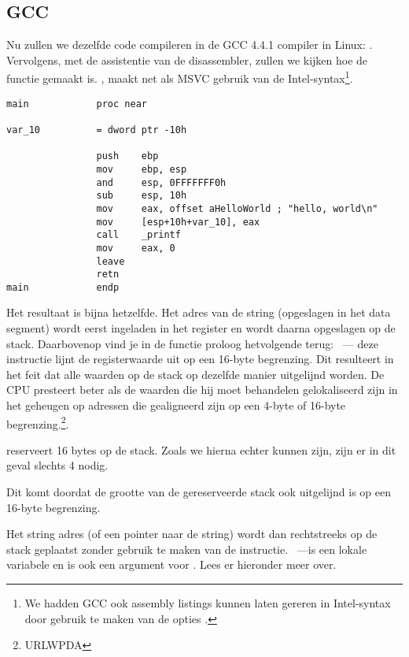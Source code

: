 \subsection{GCC}

Nu zullen we dezelfde \CCpp code compileren in de GCC 4.4.1 compiler in Linux: .
Vervolgens, met de assistentie van de \IDA disassembler, zullen we kijken hoe de \main functie gemaakt is.
\IDA, maakt net als MSVC gebruik van de Intel-syntax\footnote{We hadden GCC ook assembly listings kunnen laten gereren in Intel-syntax door gebruik te maken van de opties .}.

\begin{lstlisting}[caption=code in \IDA]
main            proc near

var_10          = dword ptr -10h

                push    ebp
                mov     ebp, esp
                and     esp, 0FFFFFFF0h
                sub     esp, 10h
                mov     eax, offset aHelloWorld ; "hello, world\n"
                mov     [esp+10h+var_10], eax
                call    _printf
                mov     eax, 0
                leave
                retn
main            endp
\end{lstlisting}

Het resultaat is bijna hetzelfde.
Het adres van de  string (opgeslagen in het data segment) wordt eerst ingeladen in het \EAX register en wordt daarna opgeslagen op de stack.
Daarbovenop vind je in de functie proloog hetvolgende terug: ~---
deze instructie lijnt de \ESP registerwaarde uit op een 16-byte begrenzing.
Dit resulteert in het feit dat alle waarden op de stack op dezelfde manier uitgelijnd worden.
De CPU presteert beter als de waarden die hij moet behandelen gelokaliseerd zijn in het geheugen op adressen die gealigneerd zijn op een 4-byte of 16-byte begrenzing.\footnote{URLWPDA}.

 reserveert 16 bytes op de stack. Zoals we hierna echter kunnen zijn, zijn er in dit geval slechts 4 nodig.

Dit komt doordat de grootte van de gereserveerde stack ook uitgelijnd is op een 16-byte begrenzing.

Het string adres (of een pointer naar de string) wordt dan rechtstreeks op de stack geplaatst zonder gebruik te maken van de \PUSH instructie.
~---is een lokale variabele en is ook een argument voor \printf{}.
Lees er hieronder meer over.

